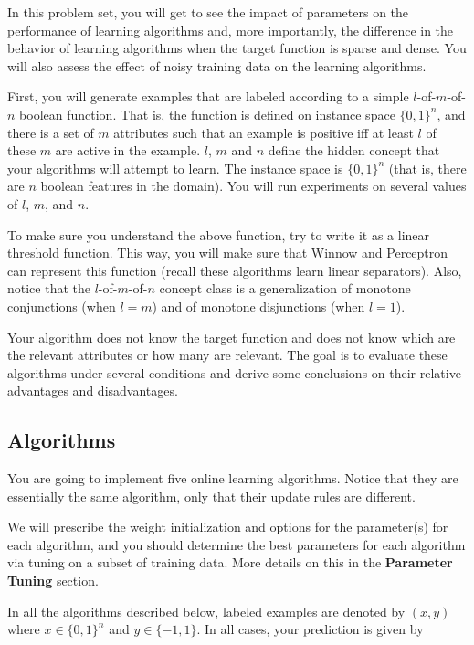In this problem set, you will get to see the impact of parameters on
the performance of learning algorithms and, more importantly, the
difference in the behavior of learning algorithms when the target
function is sparse and dense. You will also assess the effect of noisy
training data on the learning algorithms.

First, you will generate examples that are labeled according to a
simple $l$-of-$m$-of-$n$ boolean function. That is, the function is
defined on instance space $\{0,1\}^n$, and there is
a set of $m$ attributes such that an example is positive iff at least
$l$ of these $m$ are active in the example. $l$, $m$ and $n$ define the
hidden concept that your algorithms will attempt to learn.  The
instance space is $\{0,1\}^n$ (that is, there are $n$ boolean features
in the domain).  You will run experiments on several values of $l$,
$m$, and $n$.

To make sure you understand the above function, try to write it as a
linear threshold function. This way, you will make sure that Winnow
and Perceptron can represent this function (recall these algorithms
learn linear separators). Also, notice that the $l$-of-$m$-of-$n$ concept
class is a generalization of monotone conjunctions (when $l=m$) and of monotone
disjunctions (when $l=1$).

Your algorithm does not know the target function and does not know
which are the relevant attributes or how many are relevant.  The goal
is to evaluate these algorithms under several conditions and derive
some conclusions on their relative advantages and disadvantages.

\subsection*{Algorithms}

You are going to implement five online learning algorithms.  Notice that
they are essentially the same algorithm, only that their update rules are
different.

We will prescribe the weight initialization and options for the
parameter(s) for each algorithm, and you should determine the best
parameters for each algorithm via tuning on a subset of training
data. More details on this in the {\bf Parameter Tuning} section.

In all the algorithms described below, labeled examples are denoted by
$(x,y)$ where $x \in \{0,1\}^n$ and $y \in \{-1,1\}$. In all cases,
your prediction is given by

